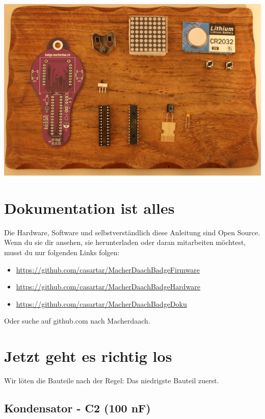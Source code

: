 \documentclass{article}
\begin{document}
\begin{center}
\includegraphics[width=\textwidth]{Bilder2024/IMG_0030.JPG}
\label{fig:all_components}
\end{center}

\section{Dokumentation ist alles}

Die Hardware, Software und selbstverständlich diese Anleitung sind Open Source. Wenn du sie dir ansehen, sie herunterladen oder daran mitarbeiten möchtest, musst du nur folgenden Links folgen:

\begin{itemize}
	\item \url{https://github.com/casartar/MacherDaachBadgeFirmware}
	\item \url{https://github.com/casartar/MacherDaachBadgeHardware}
	\item \url{https://github.com/casartar/MacherDaachBadgeDoku}
\end{itemize}

Oder suche auf github.com nach Macherdaach.

\section{Jetzt geht es richtig los}
Wir löten die Bauteile nach der Regel: Das niedrigste Bauteil zuerst.

\subsection{Kondensator - C2 (100 nF)}
\end{document}
